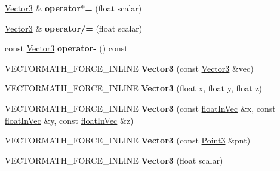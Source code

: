 \begin{DoxyCompactItemize}
\hyperlink{classVectormath_1_1Aos_1_1Vector3}{Vector3} \& {\bfseries operator$\ast$=} (float scalar)
\item 
\mbox{\label{classVectormath_1_1Aos_1_1Vector3_af2093567ccba7d8776be1d00ab1d8d7f}} 
\hyperlink{classVectormath_1_1Aos_1_1Vector3}{Vector3} \& {\bfseries operator/=} (float scalar)
\item 
\mbox{\label{classVectormath_1_1Aos_1_1Vector3_ae4edc0d1ff93cf2bc3ce26147507e3d6}} 
const \hyperlink{classVectormath_1_1Aos_1_1Vector3}{Vector3} {\bfseries operator-\/} () const
\item 
\mbox{\label{classVectormath_1_1Aos_1_1Vector3_ac61c5909c53f4daf35a4950a94de9b1d}} 
V\+E\+C\+T\+O\+R\+M\+A\+T\+H\+\_\+\+F\+O\+R\+C\+E\+\_\+\+I\+N\+L\+I\+NE {\bfseries Vector3} (const \hyperlink{classVectormath_1_1Aos_1_1Vector3}{Vector3} \&vec)
\item 
\mbox{\label{classVectormath_1_1Aos_1_1Vector3_a0cded5830f3b42d3983f187fb2716f4f}} 
V\+E\+C\+T\+O\+R\+M\+A\+T\+H\+\_\+\+F\+O\+R\+C\+E\+\_\+\+I\+N\+L\+I\+NE {\bfseries Vector3} (float x, float y, float z)
\item 
\mbox{\label{classVectormath_1_1Aos_1_1Vector3_a874d7dcc3d4a96d00811606f9e6fc701}} 
V\+E\+C\+T\+O\+R\+M\+A\+T\+H\+\_\+\+F\+O\+R\+C\+E\+\_\+\+I\+N\+L\+I\+NE {\bfseries Vector3} (const \hyperlink{classVectormath_1_1floatInVec}{float\+In\+Vec} \&x, const \hyperlink{classVectormath_1_1floatInVec}{float\+In\+Vec} \&y, const \hyperlink{classVectormath_1_1floatInVec}{float\+In\+Vec} \&z)
\item 
\mbox{\label{classVectormath_1_1Aos_1_1Vector3_a5c4725284242af1e99b5ab244c03ad2e}} 
V\+E\+C\+T\+O\+R\+M\+A\+T\+H\+\_\+\+F\+O\+R\+C\+E\+\_\+\+I\+N\+L\+I\+NE {\bfseries Vector3} (const \hyperlink{classVectormath_1_1Aos_1_1Point3}{Point3} \&pnt)
\item 
\mbox{\label{classVectormath_1_1Aos_1_1Vector3_aa64785a6836fa840d949fecd6d419721}} 
V\+E\+C\+T\+O\+R\+M\+A\+T\+H\+\_\+\+F\+O\+R\+C\+E\+\_\+\+I\+N\+L\+I\+NE {\bfseries Vector3} (float scalar)

\end{DoxyCompactItemize}

